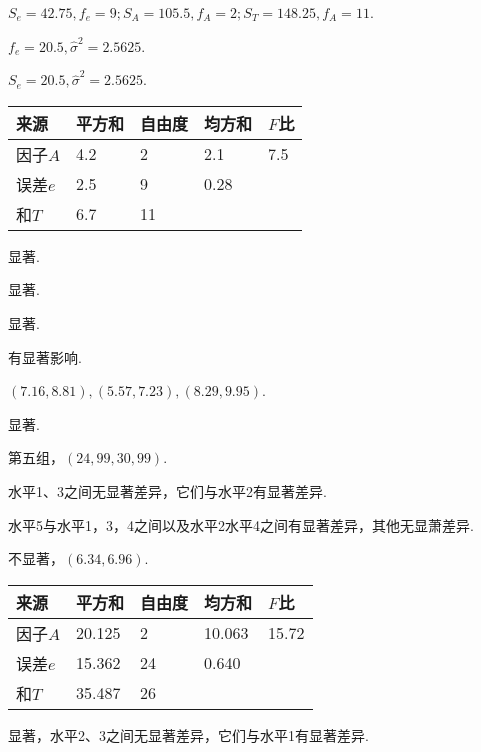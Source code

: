 \begin{answer}
  \item $S_e=42.75,f_e=9;S_A=105.5,f_A=2;S_T=148.25,f_A=11$.
  \item $f_e=20.5,\hat\sigma^2=2.5625$.
  \item $S_e=20.5,\hat\sigma^2=2.5625$.
  \item
  \begin{tabularx}{0.7\linewidth}{ZZZZZ}
    \toprule
    来源 & 平方和 & 自由度 & 均方和 & $F$比 \\
    \midrule
    因子$A$ & 4.2 & 2 & 2.1 & 7.5 \\
    误差$e$ & 2.5 & 9 & 0.28 \\
    \midrule
    和$T$ & 6.7 & 11 \\
    \bottomrule
  \end{tabularx}

  显著.
  \item 显著.
  \item 显著.
  \item \begin{enumerate*}
    \item 有显著影响.
    \item $(7.16,8.81),(5.57,7.23),(8.29,9.95)$.
  \end{enumerate*}
  \item \begin{enumerate*}
    \item 显著.
    \item 第五组，$(24,99,30,99)$.
  \end{enumerate*}
\end{answer}

\begin{answer}
  \item 水平1、3之间无显著差异，它们与水平2有显著差异.
  \item 水平5与水平1，3，4之间以及水平2水平4之间有显著差异，其他无显萧差异.
  \item 不显著，$(6.34,6.96)$.
  \item
  \begin{tabularx}{0.7\linewidth}{ZZZZZ}
    \toprule
    来源 & 平方和 & 自由度 & 均方和 & $F$比 \\
    \midrule
    因子$A$ & 20.125 & 2 & 10.063 & 15.72 \\
    误差$e$ & 15.362 & 24 & 0.640 \\
    \midrule
    和$T$ & 35.487 &26 \\
    \bottomrule
  \end{tabularx}

  显著，水平2、3之间无显著差异，它们与水平1有显著差异.
\end{answer}

